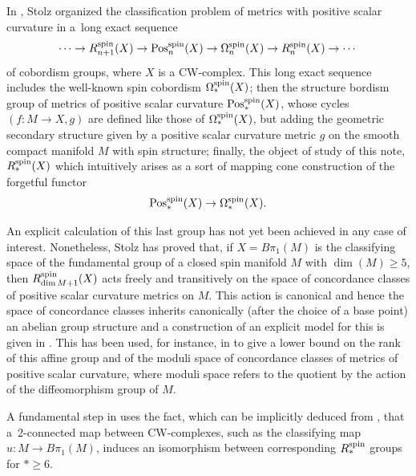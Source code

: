 \documentclass[pdftex]{sigma}
\numberwithin{equation}{section}
\begin{document}
In \cite{Stolz}, Stolz organized the classification problem of metrics with positive scalar curvature in a~long exact sequence
\begin{equation}
	\label{eq:Stolz}
	\cdots \to R^{\rm spin}_{n+1}(X) \to \mathrm{Pos}^{\rm spin}_n(X) \to \Omega^{\rm spin}_n(X) \to R^{\rm spin}_n(X) \to \cdots
\end{equation}
of cobordism groups, where $X$ is a CW-complex. This long exact sequence
includes the well-known spin cobordism $\Omega_*^{\rm spin}(X)$; then the
structure bordism group of metrics of positive scalar curvature
$\mathrm{Pos}_*^{\rm spin}(X)$, whose cycles $(f\colon M\to X,g)$ are defined like
those of $\Omega_*^{\rm spin}(X)$, but adding the geometric secondary structure
given by a positive scalar curvature metric $g$ on the smooth compact manifold
$M$ with spin structure; finally, the object of study of this note,
$ R^{\rm spin}_*(X)$ which intuitively arises as a sort of mapping cone construction of the forgetful
functor \[\mathrm{Pos}^{\rm spin}_*(X) \to \Omega^{\rm spin}_*(X).\]

An explicit calculation of this last group has not yet been achieved in any case of
interest. Nonetheless, Stolz has proved that, if $X=B\pi_1(M)$ is the
classifying space of the fundamental group of a closed spin manifold $M$ with
$\dim(M)\ge 5$, then
$ R^{\rm spin}_{\dim M+1}(X)$ acts freely and transitively on the space of
concordance classes of positive scalar curvature metrics on $M$. This action
is canonical and hence the space of concordance classes
inherits canonically (after the choice of a base point) an abelian group structure and
a construction of an explicit model for this is given in \cite[Section 4]{XieYuZeidler}. This has been used, for
instance, in \cite{PSZ2,PSZ,SZ,XieYuZeidler} to give a lower bound on the rank
of this affine group and of the moduli space of concordance classes of
metrics of positive scalar curvature, where moduli space refers to the quotient by the action of the
diffeomorphism group of $M$.

A fundamental step in \cite{SZ} uses the fact, which can be implicitly deduced
from \cite{Stolz}, that a~2-connected map between CW-complexes, such as the
classifying map $u\colon M\to B\pi_1(M)$, induces an isomorphism between
corresponding
$ R^{\rm spin}_*$ groups for $*\ge 6$.
\end{document}
